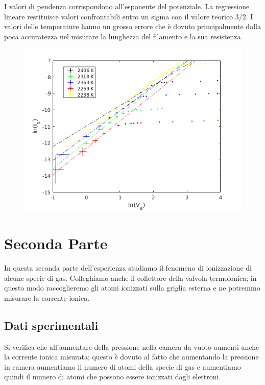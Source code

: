 \documentclass[11pt,a4paper]{article}
\begin{document}
I valori di pendenza corrispondono all'esponente del potenziale. La regressione lineare restituisce valori confrontabili entro un sigma con il valore teorico 3/2. I valori delle temperature hanno un grosso errore che è dovuto principalmente dalla poca accuratezza nel misurare la lunghezza del filamento e la sua resistenza.

\begin{figure}[h]
\includegraphics[width=\textwidth]{child}
\end{figure}

\newpage
\section{Seconda Parte}
 
In questa seconda parte dell'esperienza studiamo il fenomeno di ionizzazione di alcune specie di gas. Colleghiamo anche il collettore della valvola termoionica; in questo modo raccoglieremo gli atomi ionizzati sulla griglia esterna e ne potremmo misurare la corrente ionica. 

\subsection{Dati sperimentali}

Si verifica che all'aumentare della pressione nella camera da vuoto aumenti anche la corrente ionica misurata; questo è dovuto al fatto che aumentando la pressione in camera aumentiamo il numero di atomi della specie di gas e aumentiamo quindi il numero di atomi che possono essere ionizzati dagli elettroni.
\end{document}
